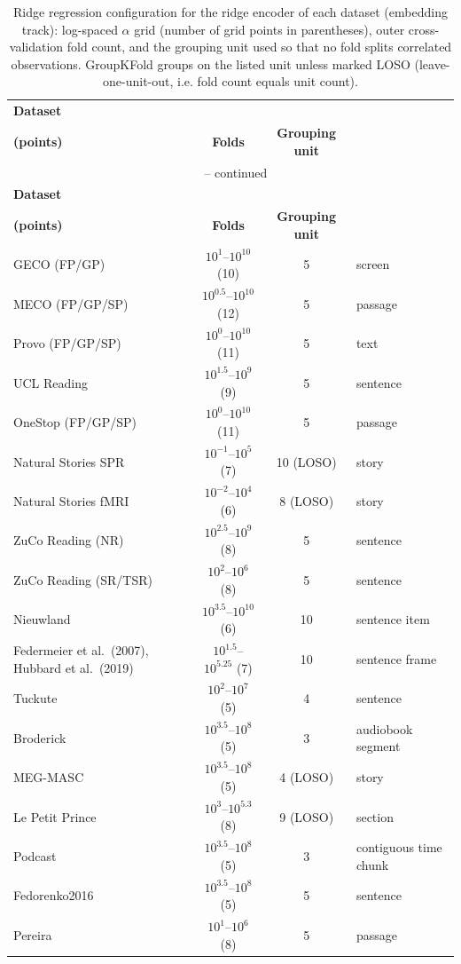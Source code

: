 {\setlength{\tabcolsep}{4pt}
\begin{longtable}{@{}p{5.2cm}ccp{2.8cm}@{}}
\caption{Ridge regression configuration for the ridge encoder of each dataset (embedding track): log-spaced $\alpha$ grid (number of grid points in parentheses), outer cross-validation fold count, and the grouping unit used so that no fold splits correlated observations. GroupKFold groups on the listed unit unless marked LOSO (leave-one-unit-out, i.e. fold count equals unit count).}
\label{tab:ridge-config} \\
\toprule
\textbf{Dataset} & \shortstack{\textbf{$\alpha$ grid}\\\textbf{(points)}} & \textbf{Folds} & \textbf{Grouping unit} \\
\midrule
\endfirsthead
\multicolumn{4}{c}{\tablename\ \thetable{} -- continued} \\
\toprule
\textbf{Dataset} & \shortstack{\textbf{$\alpha$ grid}\\\textbf{(points)}} & \textbf{Folds} & \textbf{Grouping unit} \\
\midrule
\endhead
\bottomrule
\endlastfoot
GECO (FP/GP) & $10^{1}$--$10^{10}$ (10) & 5 & screen \\
MECO (FP/GP/SP) & $10^{0.5}$--$10^{10}$ (12) & 5 & passage \\
Provo (FP/GP/SP) & $10^{0}$--$10^{10}$ (11) & 5 & text \\
UCL Reading & $10^{1.5}$--$10^{9}$ (9) & 5 & sentence \\
OneStop (FP/GP/SP) & $10^{0}$--$10^{10}$ (11) & 5 & passage \\
Natural Stories SPR & $10^{-1}$--$10^{5}$ (7) & 10 (LOSO) & story \\
Natural Stories fMRI & $10^{-2}$--$10^{4}$ (6) & 8 (LOSO) & story \\
ZuCo Reading (NR) & $10^{2.5}$--$10^{9}$ (8) & 5 & sentence \\
ZuCo Reading (SR/TSR) & $10^{2}$--$10^{6}$ (8) & 5 & sentence \\
Nieuwland & $10^{3.5}$--$10^{10}$ (6) & 10 & sentence item \\
Federmeier et al.\ (2007), Hubbard et al.\ (2019) & $10^{1.5}$--$10^{5.25}$ (7) & 10 & sentence frame \\
Tuckute & $10^{2}$--$10^{7}$ (5) & 4 & sentence \\
Broderick & $10^{3.5}$--$10^{8}$ (5) & 3 & audiobook segment \\
MEG-MASC & $10^{3.5}$--$10^{8}$ (5) & 4 (LOSO) & story \\
Le Petit Prince & $10^{3}$--$10^{5.3}$ (8) & 9 (LOSO) & section \\
Podcast & $10^{3.5}$--$10^{8}$ (5) & 3 & contiguous time chunk \\
Fedorenko2016 & $10^{3.5}$--$10^{8}$ (5) & 5 & sentence \\
Pereira & $10^{1}$--$10^{6}$ (8) & 5 & passage \\
\end{longtable}
}
